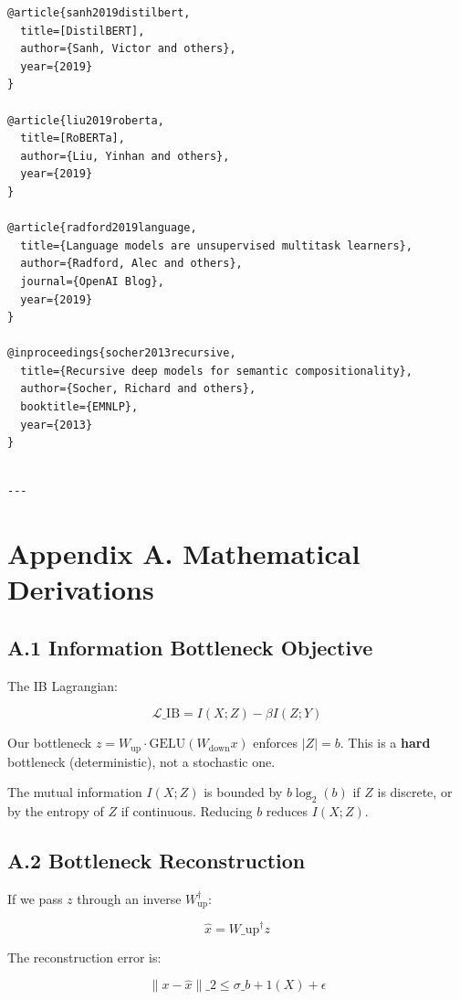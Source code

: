 \begin{lstlisting}
@article{sanh2019distilbert,
  title=[DistilBERT],
  author={Sanh, Victor and others},
  year={2019}
}

@article{liu2019roberta,
  title=[RoBERTa],
  author={Liu, Yinhan and others},
  year={2019}
}

@article{radford2019language,
  title={Language models are unsupervised multitask learners},
  author={Radford, Alec and others},
  journal={OpenAI Blog},
  year={2019}
}

@inproceedings{socher2013recursive,
  title={Recursive deep models for semantic compositionality},
  author={Socher, Richard and others},
  booktitle={EMNLP},
  year={2013}
}
\end{lstlisting}
\begin{lstlisting}

---
\end{lstlisting}

\section{Appendix A. Mathematical Derivations}

\subsection{A.1 Information Bottleneck Objective}

The IB Lagrangian:

\[
\mathcal{L}\_\text{IB} = I(X; Z) - \beta I(Z; Y)
\tag{A.1}
\]

Our bottleneck $z = W_\text{up} \cdot \text{GELU}(W_\text{down} x)$ 
enforces $|Z| = b$. This is a \textbf{hard} bottleneck (deterministic), not a 
stochastic one.

The mutual information $I(X; Z)$ is bounded by $b \log_2(b)$ if $Z$ is 
discrete, or by the entropy of $Z$ if continuous. Reducing $b$ reduces 
$I(X; Z)$.

\subsection{A.2 Bottleneck Reconstruction}

If we pass $z$ through an inverse $W_\text{up}^\dagger$:

\[
\hat{x} = W\_\text{up}^\dagger z
\tag{A.2}
\]

The reconstruction error is:

\[
\|x - \hat{x}\|\_2 \leq \sigma\_{b+1}(X) + \epsilon
\tag{A.3}
\]

